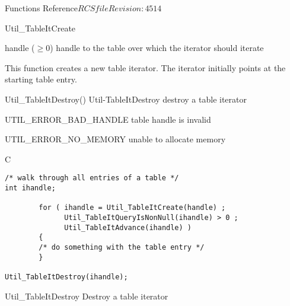 \begin{cactuspart}{ Functions Reference}{$RCSfile$}{$Revision: 4514 $}
\begin{FunctionDescription}{Util\_TableItCreate}
\begin{ParameterSection}
\begin{Parameter}{handle ($\ge 0$)}
handle to the table over which the iterator should iterate
\end{Parameter}
\end{ParameterSection}

\begin{Discussion}
This function creates a new table iterator.  The iterator initially
points at the starting table entry.
\end{Discussion}

\begin{SeeAlsoSection}
\begin{SeeAlso2} {Util\_TableItDestroy()} {Util-TableItDestroy}
destroy a table iterator
\end{SeeAlso2}
\end{SeeAlsoSection}

\begin{ErrorSection}
\begin{Error}{UTIL\_ERROR\_BAD\_HANDLE}
table handle is invalid
\end{Error}
\begin{Error}{UTIL\_ERROR\_NO\_MEMORY}
unable to allocate memory
\end{Error}
\end{ErrorSection}

\begin{ExampleSection}
\begin{Example}{C}
\begin{verbatim}
/* walk through all entries of a table */
int ihandle;

        for ( ihandle = Util_TableItCreate(handle) ;
              Util_TableItQueryIsNonNull(ihandle) > 0 ;
              Util_TableItAdvance(ihandle) )
        {
        /* do something with the table entry */
        }

Util_TableItDestroy(ihandle);
\end{verbatim}
\end{Example}
\end{ExampleSection}
\end{FunctionDescription}


\begin{FunctionDescription}{Util\_TableItDestroy}
\label{Util-TableItDestroy}
Destroy a table iterator


\end{FunctionDescription}
\end{cactuspart}
